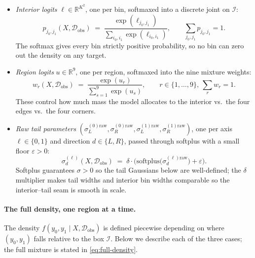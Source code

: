 \documentclass[11pt]{article}
\theoremstyle{plain}
\theoremstyle{definition}
\theoremstyle{remark}
\begin{document}
\begin{itemize}
  \item \emph{Interior logits} $\ell \in \mathbb{R}^{K^2}$, one per
    bin, softmaxed into a discrete joint on $\mathcal{I}$:
    \begin{equation}
      p_{j_0, j_1}(X, \mathcal{D}_{\mathrm{obs}})
      \;=\;
      \frac{\exp(\ell_{j_0, j_1})}
           {\sum_{i_0, i_1} \exp(\ell_{i_0, i_1})},
      \qquad
      \sum_{j_0, j_1} p_{j_0, j_1} = 1.
      \label{eq:pmat-softmax}
    \end{equation}
    The softmax gives every bin strictly positive probability, so no
    bin can zero out the density on any target.
  \item \emph{Region logits} $u \in \mathbb{R}^{9}$, one per region,
    softmaxed into the nine mixture weights:
    \begin{equation}
      w_r(X, \mathcal{D}_{\mathrm{obs}})
      \;=\; \frac{\exp(u_r)}{\sum_{s=1}^{9} \exp(u_s)},
      \qquad r \in \{1, \dots, 9\},\ \sum_r w_r = 1.
      \label{eq:region-weights}
    \end{equation}
    These control how much mass the model allocates to the interior
    vs.\ the four edges vs.\ the four corners.
  \item \emph{Raw tail parameters}
    $(\sigma_{L}^{(0)\text{raw}}, \sigma_{R}^{(0)\text{raw}},
      \sigma_{L}^{(1)\text{raw}}, \sigma_{R}^{(1)\text{raw}})$,
    one per axis $\ell \in \{0, 1\}$ and direction $d \in \{L, R\}$,
    passed through softplus with a small floor $\varepsilon > 0$:
    \begin{equation}
      \sigma_{d}^{(\ell)}(X, \mathcal{D}_{\mathrm{obs}})
      \;=\; \delta \cdot
      \bigl(\mathrm{softplus}\bigl(\sigma_{d}^{(\ell)\text{raw}}\bigr)
            + \varepsilon\bigr).
      \label{eq:tail-scales}
    \end{equation}
    Softplus guarantees $\sigma > 0$ so the tail Gaussians below are
    well-defined; the $\delta$ multiplier makes tail widths and
    interior bin widths comparable so the interior--tail seam is
    smooth in scale.
\end{itemize}

\paragraph{The full density, one region at a time.}
The density $f(y_0, y_1 \mid X, \mathcal{D}_{\mathrm{obs}})$ is defined
piecewise depending on where $(y_0, y_1)$ falls relative to the box
$\mathcal{I}$. Below we describe each of the three cases; the full
mixture is stated in
\eqref{eq:full-density}.
\end{document}
